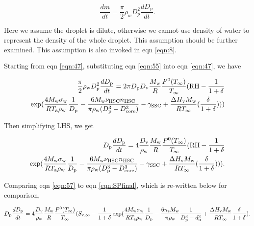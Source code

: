 \documentclass[12pt]{article}
\begin{document}
\begin{equation}\label{eqn:55}
\frac{dm}{dt}=\frac{\pi}{2}\rho_wD_{p}^{2}\frac{dD_{p}}{dt}.
\end{equation}

Here we assume the droplet is dilute, otherwise we cannot use density of water to represent the density of the whole droplet.
This assumption should be further examined. This assumption is also invoked in eqn \ref{eqn:8}.

Starting from eqn \ref{eqn:47}, substituting eqn \ref{eqn:55} into eqn \ref{eqn:47},  we have 

\begin{eqnarray}\label{eqn:56}
\frac{\pi}{2}\rho_{\rm w}D_{\rm p}^{2}\frac{dD_{\rm p}}{dt}=2 \pi D_{\rm p} D_{\rm v}  \frac{M_{\rm w}}{R} \frac{P^{\rm 0}(T_{\infty})} {T_{\infty}} (\textrm{RH} - \frac{1}{1+\delta}  \\ \nonumber
\exp( \frac{4 M_{\rm w}\sigma_{\rm w}}{R T_{\rm a} \rho_{\rm w}}\frac{1}{D_{\rm p}}-\frac{6M_{\rm w}\nu_{\rm HSC}n_{\rm HSC}}{\pi \rho_{\rm w}(D_{\rm p}^{3}-D_{\rm core}^{3})}-\gamma_{\rm SSC}+\frac{\Delta H_{\rm v} M_{\rm w}}{R T_{\infty}} (\frac{\delta}{1+\delta})))  \nonumber
\end{eqnarray}

Then simplifying LHS, we get 

\begin{eqnarray}\label{eqn:57}
D_{\rm p}\frac{dD_{\rm p}}{dt}=4 \frac{D_{\rm v}}{\rho_{\rm w}}  \frac{M_{\rm w}}{R} \frac{P^{\rm 0}(T_{\infty})} {T_{\infty}} (\textrm{RH} - \frac{1}{1+\delta}  \\ \nonumber
\exp( \frac{4 M_{\rm w}\sigma_{\rm w}}{R T_{\rm a} \rho_{\rm w}}\frac{1}{D_{\rm p}}-\frac{6M_{\rm w}\nu_{\rm HSC}n_{\rm HSC}}{\pi \rho_{\rm w}(D_{\rm p}^{3}-D_{\rm core}^{3})}-\gamma_{\rm SSC}+\frac{\Delta H_{\rm v} M_{\rm w}}{R T_{\infty}} (\frac{\delta}{1+\delta}))).  \nonumber
\end{eqnarray}

Comparing eqn \ref{eqn:57} to eqn \ref{eqn:SPfinal}, which is re-written below for comparison,

\begin{equation}\label{eqn:58}
D_{\rm p}\frac{dD_{\rm p}}{dt}=4 \frac{D_{\rm v}} {\rho_{\rm w}} \frac{M_{\rm w}}{R} \frac{P^{\rm 0}(T_{\infty})} {T_{\infty}} (S_{\rm v, \infty} - \frac{1}{1+\delta} \exp(\frac{4 M_{\rm w}\sigma_{\rm w}}{R T_{\rm a} \rho_{\rm w}}\frac{1}{D_{\rm p}}-\frac{6 n_{\rm s} M_{\rm w}}{\pi \rho_{\rm w}} \frac{1}{D_{\rm p}^{3}-d_{\rm u}^{3}}+\frac{\Delta H_{\rm v} M_{\rm w}}{R T_{\infty}} \frac{\delta}{1+\delta}). \nonumber
\end{equation} 
\end{document}

